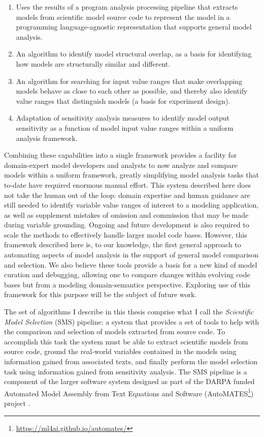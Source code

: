 \begin{enumerate}
  \item Uses the results of a program analysis processing pipeline that extracts models from scientific model source code to represent the model in a programming language-agnostic representation that supports general model analysis.
  \item An algorithm to identify model structural overlap, as a basis for identifying how models are structurally similar and different.
  \item An algorithm for searching for input value ranges that make overlapping models behave as close to each other as possible, and thereby also identify value ranges that distinguish models (a basis for experiment design).
  \item Adaptation of sensitivity analysis measures to identify model output sensitivity as a function of model input value ranges within a uniform analysis framework.
\end{enumerate}

Combining these capabilities into a single framework provides a facility for domain-expert model developers and analysts to now analyze and compare models within a uniform framework, greatly simplifying model analysis tasks that to-date have required enormous manual effort.
This system described here does not take the human out of the loop: domain expertise and human guidance are still needed to identify variable value ranges of interest to a modeling application, as well as supplement mistakes of omission and commission that may be made during variable grounding.
Ongoing and future development is also required to scale the methods to effectively handle larger model code bases.
However, this framework described here is, to our knowledge, the first general approach to automating aspects of model analysis in the support of general model comparison and selection.
We also believe these tools provide a basis for a new kind of model curation and debugging, allowing one to compare changes within evolving code bases but from a modeling domain-semantics perspective. Exploring use of this framework for this purpose will be the subject of future work.

The set of algorithms I describe in this thesis comprise what I call the \emph{Scientific Model Selection} (SMS) pipeline: a system that provides a set of tools to help with the comparison and selection of models extracted from source code.
To accomplish this task the system must be able to extract scientific models from source code, ground the real-world variables contained in the models using information gained from associated texts, and finally perform the model selection task using information gained from sensitivity analysis.
The SMS pipeline is a component of the larger software system designed as part of the DARPA funded Automated Model Assembly from Text Equations and Software (AutoMATES\footnote{\url{https://ml4ai.github.io/automates/}}) project \citep{pyarelal2019}.

